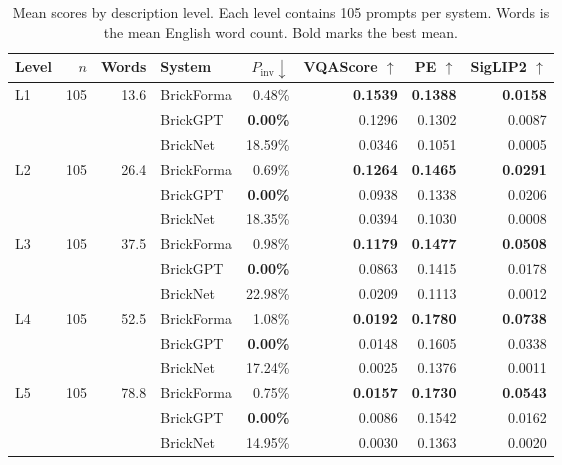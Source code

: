 \begin{table}[t]
\centering\small
\setlength{\tabcolsep}{3pt}
\begin{tabular}{lrrlrrrr}
\toprule
Level & $n$ & Words & System & $P_{\mathrm{inv}}\downarrow$ & VQAScore $\uparrow$ & PE $\uparrow$ & SigLIP2 $\uparrow$ \\
\midrule
L1 & 105 & 13.6 & BrickForma & 0.48\% & \textbf{0.1539} & \textbf{0.1388} & \textbf{0.0158} \\
 &  &  & BrickGPT & \textbf{0.00\%} & 0.1296 & 0.1302 & 0.0087 \\
 &  &  & BrickNet & 18.59\% & 0.0346 & 0.1051 & 0.0005 \\
\midrule
L2 & 105 & 26.4 & BrickForma & 0.69\% & \textbf{0.1264} & \textbf{0.1465} & \textbf{0.0291} \\
 &  &  & BrickGPT & \textbf{0.00\%} & 0.0938 & 0.1338 & 0.0206 \\
 &  &  & BrickNet & 18.35\% & 0.0394 & 0.1030 & 0.0008 \\
\midrule
L3 & 105 & 37.5 & BrickForma & 0.98\% & \textbf{0.1179} & \textbf{0.1477} & \textbf{0.0508} \\
 &  &  & BrickGPT & \textbf{0.00\%} & 0.0863 & 0.1415 & 0.0178 \\
 &  &  & BrickNet & 22.98\% & 0.0209 & 0.1113 & 0.0012 \\
\midrule
L4 & 105 & 52.5 & BrickForma & 1.08\% & \textbf{0.0192} & \textbf{0.1780} & \textbf{0.0738} \\
 &  &  & BrickGPT & \textbf{0.00\%} & 0.0148 & 0.1605 & 0.0338 \\
 &  &  & BrickNet & 17.24\% & 0.0025 & 0.1376 & 0.0011 \\
\midrule
L5 & 105 & 78.8 & BrickForma & 0.75\% & \textbf{0.0157} & \textbf{0.1730} & \textbf{0.0543} \\
 &  &  & BrickGPT & \textbf{0.00\%} & 0.0086 & 0.1542 & 0.0162 \\
 &  &  & BrickNet & 14.95\% & 0.0030 & 0.1363 & 0.0020 \\
\bottomrule
\end{tabular}
\caption{Mean scores by description level. Each level contains 105 prompts per system. Words is the mean English word count. Bold marks the best mean.}
\label{tab:level-results}
\end{table}
